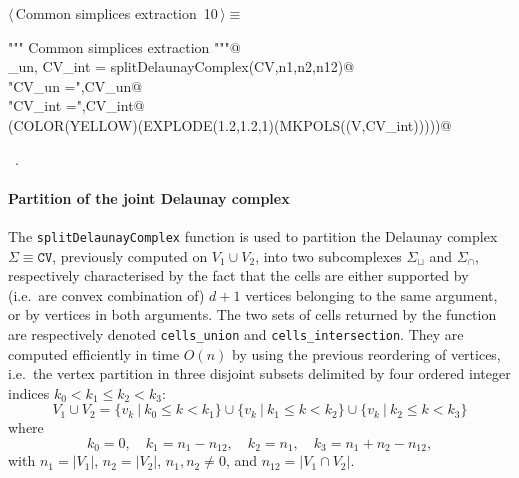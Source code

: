 \documentclass[11pt,oneside]{article}	%
\begin{document}
\begin{flushleft} \small \label{scrap14}
\protect{}$\langle\,$Common simplices extraction\nobreak\ {\footnotesize 10}$\,\rangle\equiv$
\vspace{-1ex}
\begin{list}{}{} \item
\mbox{}\verb@""" Common simplices extraction """@\\
\mbox{}\verb@CV_un, CV_int = splitDelaunayComplex(CV,n1,n2,n12)@\\
\mbox{}\verb@print "\n CV_un =",CV_un@\\
\mbox{}\verb@print "\n CV_int =",CV_int@\\
\mbox{}\verb@VIEW(COLOR(YELLOW)(EXPLODE(1.2,1.2,1)(MKPOLS((V,CV_int)))))@\\
\mbox{}\verb@@{\NWsep}
\end{list}
\vspace{-1ex}
\footnotesize\addtolength{\baselineskip}{-1ex}
\begin{list}{}{\setlength{\itemsep}{-\parsep}\setlength{\itemindent}{-\leftmargin}}
\item \NWtxtMacroRefIn\ .
\end{list}
\end{flushleft}


\paragraph{Partition of the joint Delaunay complex} 

The \texttt{splitDelaunayComplex} function is used to partition the Delaunay complex $\Sigma\equiv\texttt{CV}$, previously computed on $V_1 \cup V_2$, into two subcomplexes $\Sigma_\sqcup$ and $\Sigma_\cap$, respectively characterised by the fact that the cells  are either supported by (i.e.~are convex combination of)  $d+1$ vertices belonging to the same argument, or by vertices in both arguments.
The two sets of cells returned by the function are respectively denoted \texttt{cells\_union} and \texttt{cells\_intersection}. They are computed efficiently in time $O(n)$ by using the previous reordering of vertices, i.e.~the vertex partition in three disjoint subsets delimited by four ordered integer indices $k_0 < k_1 \leq k_2 < k_3$:
\[
V_1 \cup V_2 = 
\{v_k\ |\ k_0\leq k< k_1\} \cup
\{v_k\ |\ k_1\leq k< k_2\} \cup
\{v_k\ |\ k_2\leq k< k_3\}
\]
where
\[
k_0 =0, \quad k_1 =n_1-n_{12}, \quad k_2 =n_1, \quad  k_3=n_1+n_2-n_{12},
\]
with $n_1=|V_1|$, $n_2=|V_2|$, $n_1, n_2\not=0$, and $n_{12}=|V_1\cap V_2|$.
\end{document}
